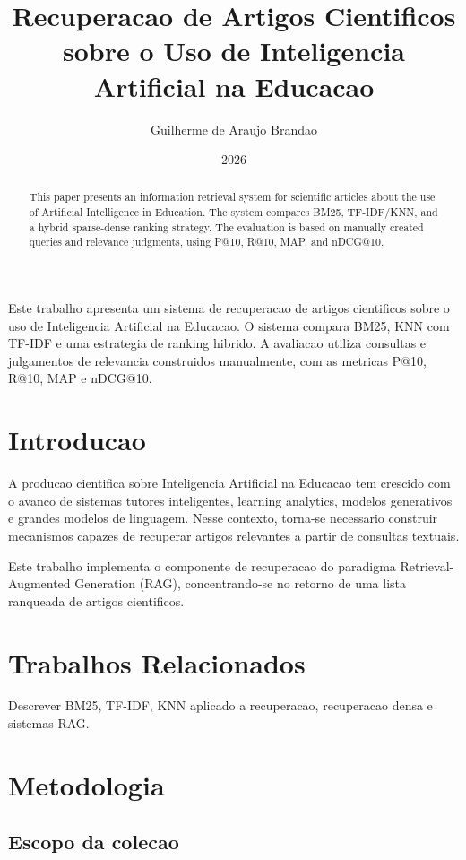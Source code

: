 \documentclass[12pt]{article}
\title{Recuperacao de Artigos Cientificos sobre o Uso de Inteligencia Artificial na Educacao}
\author{Guilherme de Araujo Brandao}
\date{2026}
\begin{document}
\maketitle

\begin{abstract}
This paper presents an information retrieval system for scientific articles about the use of Artificial Intelligence in Education. The system compares BM25, TF-IDF/KNN, and a hybrid sparse-dense ranking strategy. The evaluation is based on manually created queries and relevance judgments, using P@10, R@10, MAP, and nDCG@10.
\end{abstract}

\begin{resumo}
Este trabalho apresenta um sistema de recuperacao de artigos cientificos sobre o uso de Inteligencia Artificial na Educacao. O sistema compara BM25, KNN com TF-IDF e uma estrategia de ranking hibrido. A avaliacao utiliza consultas e julgamentos de relevancia construidos manualmente, com as metricas P@10, R@10, MAP e nDCG@10.
\end{resumo}

\section{Introducao}

A producao cientifica sobre Inteligencia Artificial na Educacao tem crescido com o avanco de sistemas tutores inteligentes, learning analytics, modelos generativos e grandes modelos de linguagem. Nesse contexto, torna-se necessario construir mecanismos capazes de recuperar artigos relevantes a partir de consultas textuais.

Este trabalho implementa o componente de recuperacao do paradigma Retrieval-Augmented Generation (RAG), concentrando-se no retorno de uma lista ranqueada de artigos cientificos.

\section{Trabalhos Relacionados}

Descrever BM25, TF-IDF, KNN aplicado a recuperacao, recuperacao densa e sistemas RAG.

\section{Metodologia}

\subsection{Escopo da colecao}
\end{document}
